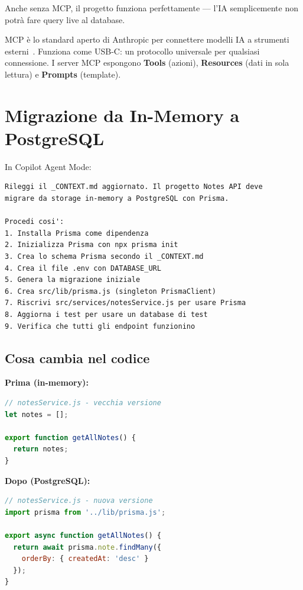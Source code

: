 \begin{tipbox}
Anche senza MCP, il progetto funziona perfettamente --- l'IA semplicemente non potrà fare query live al database.
\end{tipbox}

\begin{notebox}
MCP è lo standard aperto di Anthropic per connettere modelli IA a strumenti esterni~\cite{anthropic:mcp,mcp:spec}. Funziona come USB-C: un protocollo universale per qualsiasi connessione. I server MCP espongono \textbf{Tools} (azioni), \textbf{Resources} (dati in sola lettura) e \textbf{Prompts} (template).
\end{notebox}

\section{Migrazione da In-Memory a PostgreSQL}

\begin{praticabox}[title={Pratica --- Installazione Prisma e migrazione}]
In Copilot Agent Mode:
\begin{lstlisting}[language={}]
Rileggi il _CONTEXT.md aggiornato. Il progetto Notes API deve
migrare da storage in-memory a PostgreSQL con Prisma.

Procedi cosi':
1. Installa Prisma come dipendenza
2. Inizializza Prisma con npx prisma init
3. Crea lo schema Prisma secondo il _CONTEXT.md
4. Crea il file .env con DATABASE_URL
5. Genera la migrazione iniziale
6. Crea src/lib/prisma.js (singleton PrismaClient)
7. Riscrivi src/services/notesService.js per usare Prisma
8. Aggiorna i test per usare un database di test
9. Verifica che tutti gli endpoint funzionino
\end{lstlisting}
\end{praticabox}

\subsection*{Cosa cambia nel codice}

\textbf{Prima (in-memory):}
\begin{lstlisting}[language=JavaScript]
// notesService.js - vecchia versione
let notes = [];

export function getAllNotes() {
  return notes;
}
\end{lstlisting}

\textbf{Dopo (PostgreSQL):}
\begin{lstlisting}[language=JavaScript]
// notesService.js - nuova versione
import prisma from '../lib/prisma.js';

export async function getAllNotes() {
  return await prisma.note.findMany({
    orderBy: { createdAt: 'desc' }
  });
}
\end{lstlisting}

